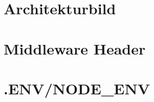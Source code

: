 \section{Architekturbild}
\lipsum[1-2]

\section{Middleware Header}
\lipsum[1-2]

\section{.ENV/NODE_ENV}
\lipsum[1-2]